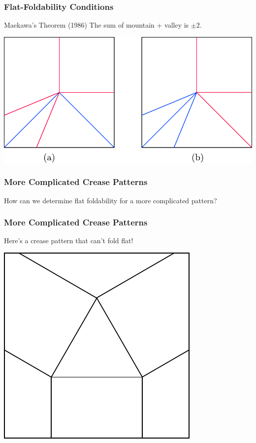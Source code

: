\documentclass{beamer}
\begin{document}
\begin{frame}
\frametitle{Flat-Foldability Conditions}
\begin{block}{Maekawa's Theorem (1986)}
The sum of mountain + valley is $\pm 2$. 
\end{block}
\includegraphics[width=\textwidth]{foldability_pix/maekawa_img.pdf}
\end{frame}

\begin{frame}
\frametitle{More Complicated Crease Patterns}
\begin{block}{}
How can we determine flat foldability for a more complicated pattern?
\newline
\end{block}
\end{frame}

\begin{frame}
\frametitle{More Complicated Crease Patterns}
\begin{block}{}
Here's a crease pattern that can't fold flat!
\end{block}
\begin{center}
\includegraphics[width=.5\textwidth]{foldability_pix/unfoldable.pdf}
\end{center}
\end{frame}
\end{document}
